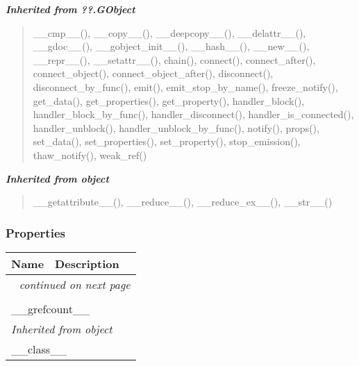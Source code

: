 \large{\textbf{\textit{Inherited from ??.GObject}}}

\begin{quote}
\_\_cmp\_\_(), \_\_copy\_\_(), \_\_deepcopy\_\_(), \_\_delattr\_\_(), \_\_gdoc\_\_(), \_\_gobject\_init\_\_(), \_\_hash\_\_(), \_\_new\_\_(), \_\_repr\_\_(), \_\_setattr\_\_(), chain(), connect(), connect\_after(), connect\_object(), connect\_object\_after(), disconnect(), disconnect\_by\_func(), emit(), emit\_stop\_by\_name(), freeze\_notify(), get\_data(), get\_properties(), get\_property(), handler\_block(), handler\_block\_by\_func(), handler\_disconnect(), handler\_is\_connected(), handler\_unblock(), handler\_unblock\_by\_func(), notify(), props(), set\_data(), set\_properties(), set\_property(), stop\_emission(), thaw\_notify(), weak\_ref()
\end{quote}

\large{\textbf{\textit{Inherited from object}}}

\begin{quote}
\_\_getattribute\_\_(), \_\_reduce\_\_(), \_\_reduce\_ex\_\_(), \_\_str\_\_()
\end{quote}


  \subsubsection{Properties}

    \vspace{-1cm}
\hspace{\varindent}\begin{longtable}{|p{\varnamewidth}|p{\vardescrwidth}|l}
\cline{1-2}
\cline{1-2} \centering \textbf{Name} & \centering \textbf{Description}& \\
\cline{1-2}
\endhead\cline{1-2}\multicolumn{3}{r}{\small\textit{continued on next page}}\\\endfoot\cline{1-2}
\endlastfoot\multicolumn{2}{|l|}{\textit{Inherited from ??.GObject}}\\
\multicolumn{2}{|p{\varwidth}|}{\raggedright \_\_grefcount\_\_}\\
\cline{1-2}
\multicolumn{2}{|l|}{\textit{Inherited from object}}\\
\multicolumn{2}{|p{\varwidth}|}{\raggedright \_\_class\_\_}\\
\cline{1-2}
\end{longtable}


